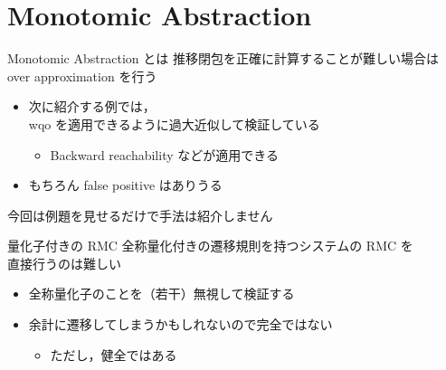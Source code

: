 \documentclass[presentation, xetex]{beamer}
\begin{document}
\section{Monotomic Abstraction}
\label{sec:org19d27bf}

\begin{frame}[label={sec:orgea62520}]{Monotomic Abstraction とは}
推移閉包を正確に計算することが難しい場合は \\
\alert{\alert{over approximation}} を行う
\begin{itemize}
\item 次に紹介する例では，\\
wqo を適用できるように過大近似して検証している
\begin{itemize}
\item Backward reachability などが適用できる
\end{itemize}
\item もちろん false positive はありうる
\end{itemize}


今回は例題を見せるだけで手法は紹介しません
\end{frame}


\begin{frame}[label={sec:org7b73113}]{量化子付きの RMC}
全称量化付きの遷移規則を持つシステムの RMC を \\
直接行うのは難しい
\begin{itemize}
\item 全称量化子のことを（若干）無視して検証する
\item 余計に遷移してしまうかもしれないので完全ではない
\begin{itemize}
\item ただし，健全ではある
\end{itemize}
\end{itemize}
\end{frame}
\end{document}
